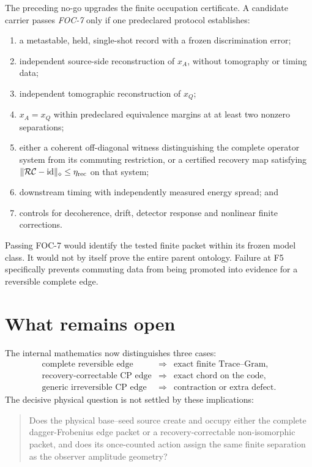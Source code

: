 \documentclass[11pt]{article}
\newcommand{\id}{\operatorname{id}}
\begin{document}
The preceding no-go upgrades the finite occupation certificate.  A candidate
carrier passes \emph{FOC-7} only if one predeclared protocol establishes:
\begin{enumerate}[label=(F\arabic*)]
 \item a metastable, held, single-shot record with a frozen discrimination
 error;
 \item independent source-side reconstruction of \(x_A\), without tomography
 or timing data;
 \item independent tomographic reconstruction of \(x_Q\);
 \item \(x_A=x_Q\) within predeclared equivalence margins at at least two
 nonzero separations;
 \item either a coherent off-diagonal witness distinguishing the complete
 operator system from its commuting restriction, or a certified recovery map
 satisfying \(\lVert\mathcal R\mathcal C-\id\rVert_\diamond\leq\eta_{\rm rec}\)
 on that system;
 \item downstream timing with independently measured energy spread; and
 \item controls for decoherence, drift, detector response and nonlinear finite
 corrections.
\end{enumerate}
Passing FOC-7 would identify the tested finite packet within its frozen model
class.  It would not by itself prove the entire parent ontology.  Failure at
F5 specifically prevents commuting data from being promoted into evidence for
a reversible complete edge.

\section{What remains open}

The internal mathematics now distinguishes three cases:
\begin{equation}
 \begin{array}{ccl}
 \text{complete reversible edge}&\Rightarrow&\text{exact finite Trace--Gram},\\
 \text{recovery-correctable CP edge}&\Rightarrow&\text{exact chord on the code},\\
 \text{generic irreversible CP edge}&\Rightarrow&\text{contraction or extra defect}.
 \end{array}
 \label{eq:three-case-fork}
\end{equation}
The decisive physical question is not settled by these implications:
\begin{quote}
Does the physical base--seed source create and occupy either the complete
dagger-Frobenius edge packet or a recovery-correctable non-isomorphic packet,
and does its once-counted action assign the same finite separation as the
observer amplitude geometry?
\end{quote}
\end{document}
